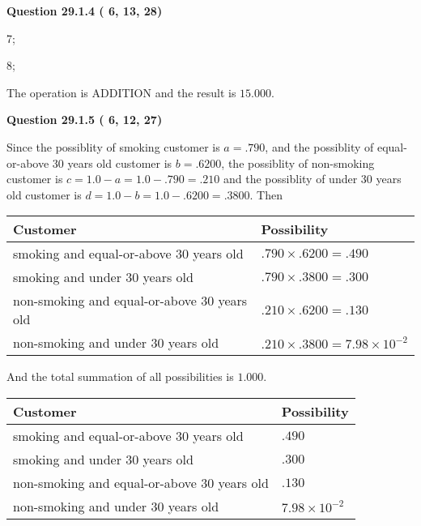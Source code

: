 \documentclass[12pt]{article}
\begin{document}
{\textbf{\Large{Question
29.1.4 
 (          6,         13,         28)
}}}
  
  
 
 
\noindent{}

7;
 
8;
 
The operation is  %
ADDITION and the result is
$ %
15.000$.
 
 
 
  
\vspace{0.2in}
  
{\textbf{\Large{Question
29.1.5 
 (          6,         12,         27)
}}}
  
  
 
 
\noindent{}

Since the possiblity of  %
smoking customer is $ a =  %
.790 $,
and the possiblity of  %
equal-or-above 30 years old customer is $ b =  %
.6200 $,
the possiblity of  %
non-smoking customer is $ c = 1.0 - a = 1.0 -
.790
=  %
.210 $ and the possiblity of  %
under 30 years old
customer is $ d = 1.0 - b = 1.0 -  %
.6200 =  %
.3800  $.
Then
 
\noindent
\begin{tabular}{|l|l|}
\hline
Customer & Possibility \\
\hline
smoking  and  %
equal-or-above 30 years old  &
  $ %
.790 \times  %
.6200 =  %
.490$ \\
\hline
smoking  and  %
under 30 years old &
  $ %
.790 \times  %
.3800 =  %
.300$ \\
\hline
 non-smoking and  %
equal-or-above 30 years old  &
  $ %
.210 \times  %
.6200 =  %
.130$ \\
\hline
 non-smoking and  %
under 30 years old &
  $ %
.210 \times  %
.3800 =  %
7.98 \times 10^{-2}$ \\
\hline
\end{tabular}
 
\noindent
And the total summation of all possibilities is $  %
1.000 $.
 
 
 
 
 
 
\noindent{}

 
\noindent
\begin{tabular}{|l|l|}
\hline
Customer & Possibility \\
\hline
smoking  and  %
equal-or-above 30 years old &
  $ %
.490$ \\
\hline
smoking  and  %
under 30 years old &
  $ %
.300$ \\
\hline
 non-smoking and  %
equal-or-above 30 years old &
  $ %
.130$ \\
\hline
 non-smoking and  %
under 30 years old &
  $ %
7.98 \times 10^{-2}$ \\
\hline
\end{tabular}
 
\end{document}
